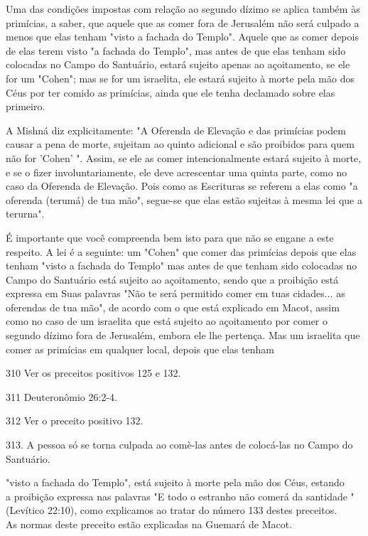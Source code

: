 \begin{itemize}
\begin{enumrate}
\begin{itemize}
\begin{itemize}
\begin{itemize}
Uma das condições impostas com relação ao segundo dízimo se aplica
também às primícias, a saber, que aquele que as comer fora de Jerusalém
não será culpado a menos que elas tenham "visto a fachada do Templo".
Aquele que as comer depois de elas terem visto "a fachada do Templo",
mas antes de que elas tenham sido colocadas no Campo do Santuário,
estará sujeito apenas ao açoitamento, se ele for um "Cohen"; mas se for
um israelita, ele estará sujei­to à morte pela mão dos Céus por ter
comido as primícias, ainda que ele tenha declamado sobre elas primeiro.

A Mishná diz explicitamente: "A Oferenda de Elevação e das primí­cias
podem causar a pena de morte, sujeitam ao quinto adicional e são
proibi­dos para quem não for 'Cohen' ". Assim, se ele as comer
intencionalmente es­tará sujeito à morte, e se o fizer
involuntariamente, ele deve acrescentar uma quinta parte, como no caso
da Oferenda de Elevação. Pois como as Escrituras se referem a elas como
"a oferenda (terumá) de tua mão", segue-se que elas estão sujeitas à
mesma lei que a terurna".

É importante que você compreenda bem isto para que não se enga­ne a este
respeito. A lei é a seguinte: um "Cohen" que comer das primícias de­pois
que elas tenham "visto a fachada do Templo" mas antes de que tenham sido
colocadas no Campo do Santuário está sujeito ao açoitamento, sendo que a
proibição está expressa em Suas palavras "Não te será permitido comer em
tuas cidades... as oferendas de tua mão", de acordo com o que está
explicado em Macot, assim como no caso de um israelita que está sujeito
ao açoitamento por comer o segundo dízimo fora de Jerusalém, embora ele
lhe pertença. Mas um israelita que comer as primícias em qualquer local,
depois que elas tenham

310 Ver os preceitos positivos 125 e 132.

311 Deuteronômio 26:2-4.

312 Ver o preceito positivo 132.

313. A pessoa só se torna culpada ao comè-las antes de colocá-las no
Campo do Santuário.


"visto a fachada do Templo", está sujeito à morte pela mão dos Céus,
estando\\
a proibição expressa nas palavras "E todo o estranho não comerá da
santidade
" (Levítico 22:10), como explicamos ao tratar do número 133 destes
preceitos.\\
As normas deste preceito estão explicadas na Guemará de Macot.


\end{itemize}
\end{itemize}
\end{itemize}
\end{enumrate}
\end{itemize}
